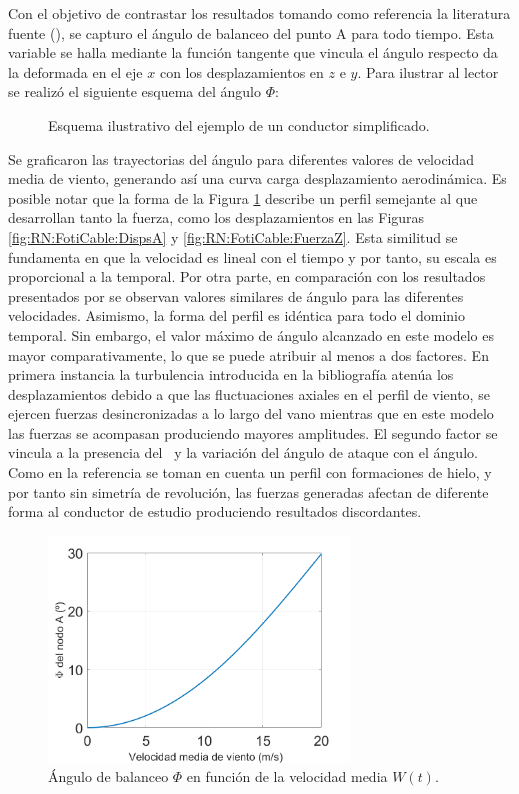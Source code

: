 Con el objetivo de contrastar los resultados tomando como referencia la literatura fuente (\textcite{foti2018finite}), se capturo el ángulo de balanceo del punto $\text{A}$ para todo tiempo. Esta variable se halla mediante la función tangente que vincula el ángulo respecto da la deformada en el eje $x$ con los desplazamientos en $z$ e $y$. Para ilustrar al lector se realizó el siguiente esquema del ángulo $\Phi$:

\begin{figure}[htbp]
	\centering
	\def\svgwidth{80mm}
	
	\caption{Esquema ilustrativo del ejemplo de un conductor simplificado.}
	\label{fig:RN:FotiCable:Angulo}
\end{figure}


Se graficaron las trayectorias del ángulo para diferentes valores de velocidad media de viento, generando así una curva carga desplazamiento aerodinámica. Es posible notar que la forma de la Figura \ref{fig:RN:FotiCable:Angulo} describe un perfil semejante al que desarrollan tanto la fuerza, como los desplazamientos en las Figuras \ref{fig:RN:FotiCable:DispsA} y \ref{fig:RN:FotiCable:FuerzaZ}. Esta similitud se fundamenta en que la velocidad es lineal con el tiempo y por tanto, su escala es proporcional a la temporal.
Por otra parte, en comparación con los resultados presentados por \cite{foti2018finite} se observan valores similares de ángulo para las diferentes velocidades. Asimismo, la forma del perfil es idéntica para todo el dominio temporal. Sin embargo, el valor máximo de ángulo alcanzado en este modelo es mayor comparativamente, lo que se puede atribuir al menos a dos factores. En primera instancia la turbulencia introducida en la bibliografía atenúa los desplazamientos debido a que las fluctuaciones axiales en el perfil de viento, se ejercen fuerzas desincronizadas a lo largo del vano mientras que en este modelo las fuerzas se acompasan produciendo mayores amplitudes. El segundo factor se vincula a la presencia del \ y la variación del ángulo de ataque con el ángulo. Como en la referencia \citep{foti2018finite} se toman en cuenta un perfil con formaciones de hielo, y por tanto sin simetría de revolución, las fuerzas generadas afectan de diferente forma al conductor de estudio produciendo resultados discordantes. 


\begin{figure}[htbp]
	\centering
	\includegraphics[width=80mm]{./imagenes/ResultadosNumericos/SimpleCable/Angulo_Foti.png}
	\caption{Ángulo de balanceo $\Phi$ en función de la velocidad media $W(t)$.}
	\label{fig:CableAngulo}
\end{figure}

